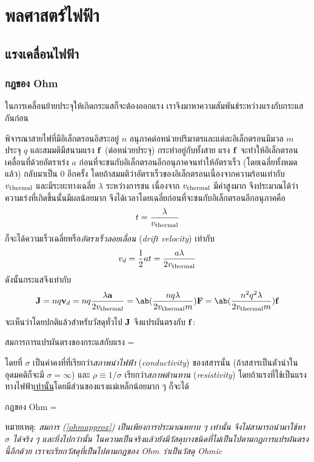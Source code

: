 \chapter{พลศาสตร์ไฟฟ้า}
\section{แรงเคลื่อนไฟฟ้า}
\subsection{กฎของ Ohm}

ในการเคลื่อนย้ายประจุให้เกิดกระแสก็จะต้องออกแรง เราจึงมาหาความสัมพันธ์ระหว่างแรงกับกระแสกันก่อน

พิจารณาสายไฟที่มีอิเล็กตรอนอิสระอยู่ $n$ อนุภาคต่อหน่วยปริมาตรและแต่ละอิเล็กตรอนมีมวล $m$ ประจุ $q$ และสมมติมีสนามแรง $\mathbf{f}$ (ต่อหน่วยประจุ) กระทำอยู่กับทั้งสาย แรง $\mathbf{f}$ จะทำให้อิเล็กตรอนเคลื่อนที่ด้วยอัตราเร่ง $a$ ก่อนที่จะชนกับอิเล็กตรอนอีกอนุภาคจนทำให้อัตราเร็ว (โดยเฉลี่ยทั้งหมดแล้ว) กลับมาเป็น $0$ อีกครั้ง โดยถ้าสมมติว่าอัตราเร็วของอิเล็กตรอนเนื่องจากความร้อนเท่ากับ $v_{\mathrm{thermal}}$ และมีระยะทางเฉลี่ย $\lambda$ ระหว่างการชน เนื่องจาก $v_{\mathrm{thermal}}$ มีค่าสูงมาก จึงประมาณได้ว่าความเร่งที่เกิดขึ้นนั้นมีผลน้อยมาก จึงได้เวลาโดยเฉลี่ยก่อนที่จะชนกับอิเล็กตรอนอีกอนุภาคคือ
\[ 
t = \frac{\lambda}{v_{\mathrm{thermal}}} 
\]
ก็จะได้ความเร็วเฉลี่ยหรือ\emph{อัตราเร็วลอยเลื่อน} (\emph{drift velocity}) เท่ากับ
\[ 
v_d = \frac{1}{2}at = \frac{a\lambda}{2v_{\mathrm{thermal}}} 
\]
ดังนั้นกระแสจึงเท่ากับ
\begin{equation} 
    \vb{J} = nq\vb{v}_d = nq\frac{\lambda\vb{a}}{2v_\txt{thermal}} = \ab(\frac{nq\lambda}{2v_\txt{thermal}m})\vb{F} = \ab(\frac{n^2q^2\lambda}{2v_\txt{thermal}m})\vb{f}\label{ohmapprox} 
\end{equation}
จะเห็นว่าโดยปกติแล้วสำหรับวัสดุทั่วไป $\mathbf{J}$ จึงแปรผันตรงกับ $\mathbf{f}$:
\begin{eqbox}{สมการการแปรผันตรงของกระแสกับแรง} 
     = \sigma{} 
\end{eqbox}
โดยที่ $\sigma$ เป็นค่าคงที่ที่เรียกว่า\emph{สภาพนำไฟฟ้า} (\emph{conductivity}) ของสสารนั้น (ถ้าสสารเป็นตัวนำในอุดมคติก็จะมี $\sigma = \infty$) และ $\rho\equiv 1/\sigma$ เรียกว่า\emph{สภาพต้านทาน} (\emph{resistivity}) โดยถ้าแรงที่ใช้เป็นแรงทางไฟฟ้า\underline{เท่านั้น}โดยมีส่วนของแรงแม่เหล็กน้อยมาก ๆ ก็จะได้
\begin{ieqbox}{กฎของ Ohm} 
     = \sigma{}\label{ohme} 
\end{ieqbox}
หมายเหตุ: \emph{สมการ (\ref{ohmapprox}) เป็นเพียงการประมาณหยาบ ๆ เท่านั้น จึงไม่สามารถนำมาใช้หา $\sigma$ ได้จริง ๆ และยิ่งไปกว่านั้น ในความเป็นจริงแล้วยังมีวัสดุบางชนิดที่ไม่เป็นไปตามกฎการแปรผันตรงนี้อีกด้วย เราจะเรียกวัสดุที่เป็นไปตามกฎของ Ohm ว่าเป็นวัสดุ Ohmic}

